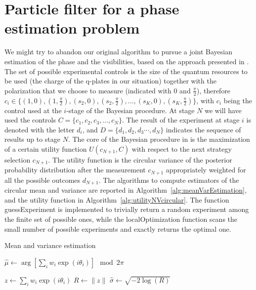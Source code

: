 \documentclass[aps, pra, 10pt, twocolumn, superscriptaddress,floatfix]{revtex4-1}
\newcommand{\norm}[1]{\lVert#1\rVert}
\begin{document}
\section{Particle filter for a phase estimation problem}
%
We might try to abandon our original algorithm to pursue a joint Bayesian estimation of the phase and the visibilities, based on the approach presented in \cite{Granade2012}. The set of possible experimental controls is the size of the quantum resources to be used (the charge of the q-plates in our situation) together with the polarization that we choose to measure (indicated with $0$ and $\frac{\pi}{2}$), therefore $c_i \in \lbrace (1, 0), (1, \frac{\pi}{2}) , (s_2, 0), (s_2, \frac{\pi}{2}), \dots, (s_K, 0), (s_K, \frac{\pi}{2}) \rbrace$, with $c_i$ being the control used at the $i$-stage of the Bayesian procedure. At stage $N$ we will have used the controls $C = \lbrace c_1, c_2, c_3, \dots, c_N \rbrace$. The result of the experiment at stage $i$ is denoted with the letter $d_i$, and $D = \lbrace d_1, d_2, d_3 \cdots, d_N \rbrace$ indicates the sequence of results up to stage $N$. The core of the Bayesian procedure in \cite{Granade2012} is the maximization of a certain utility function $U \left( c_{N+1}, C\right)$ with respect to the next strategy selection $c_{N+1}$. The utility function is the circular variance of the posterior probability distribution after the measurement $c_{N+1}$ appropriately weighted for all the possible outcomes $d_{N+1}$. The algorithms to compute estimators of the circular mean and variance are reported in Algorithm~\ref{alg:meanVarEstimation}, and the utility function in Algorithm~\ref{alg:utilityNVcircular}. The function guessExperiment is implemented to trivially return a random experiment among the finite set of possible ones, while the localOptimization function scans the small number of possible experiments and exactly returns the optimal one.
%
\begin{algorithm}[H]
	\caption{Mean and variance estimation}
	\label{alg:meanVarEstimation}
	\begin{algorithmic}[1]
		\State \Return $\hat{\mu} \gets  \arg \left[ \sum_i w_i \exp(i \theta_i) \right] \mod 2 \pi$
		\EndFunction
	\end{algorithmic}
	
	\begin{algorithmic}[1]
		\State $z \gets \sum_i w_i \exp(i \theta_i)$ 
		\State $R \gets \norm{z}$
		\State \Return $\hat{\sigma} \gets \sqrt{-2 \log(R)}$
		\EndFunction
	\end{algorithmic}
\end{algorithm}
\end{document}
